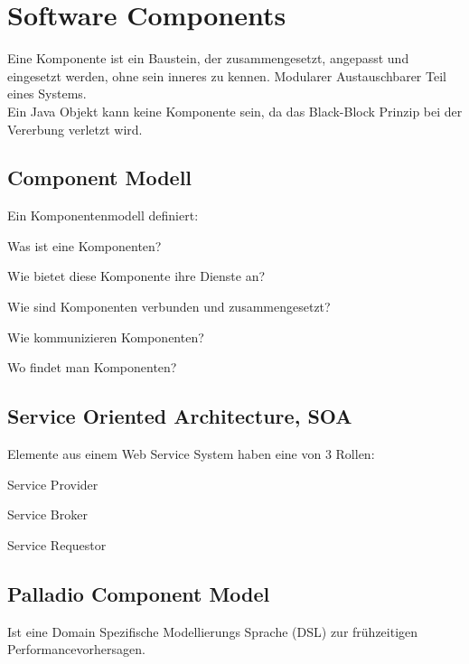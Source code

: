 \chapter{Software Components}

Eine Komponente ist ein Baustein, der zusammengesetzt, angepasst und
eingesetzt werden, ohne sein inneres zu kennen.
Modularer Austauschbarer Teil eines Systems. \\

Ein Java Objekt kann keine Komponente sein, da das Black-Block Prinzip
bei der Vererbung verletzt wird.

\section{Component Modell}
Ein Komponentenmodell definiert:
\begin{compactitem}
    \item Was ist eine Komponenten?
    \item Wie bietet diese Komponente ihre Dienste an?
    \item Wie sind Komponenten verbunden und zusammengesetzt?
    \item Wie kommunizieren Komponenten?
    \item Wo findet man Komponenten?
\end{compactitem}

\section{Service Oriented Architecture, SOA}
Elemente aus einem Web Service System haben eine von 3 Rollen:
\begin{compactitem}
    \item Service Provider
    \item Service Broker
    \item Service Requestor
\end{compactitem}

\section{Palladio Component Model}
Ist eine Domain Spezifische Modellierungs Sprache (DSL) zur frühzeitigen
Performancevorhersagen.

